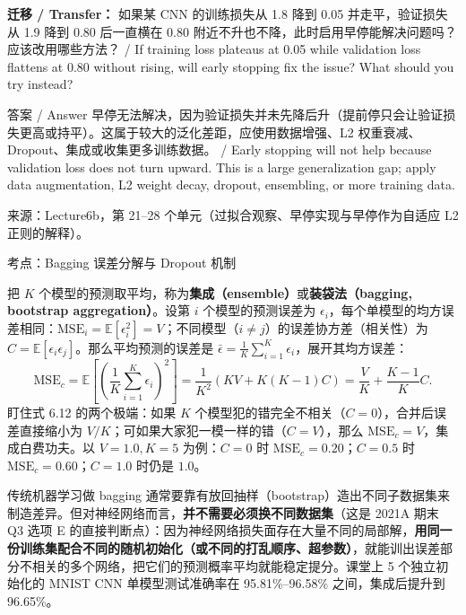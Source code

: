 \textbf{迁移 / Transfer：} 如果某 CNN 的训练损失从 1.8 降到 0.05 并走平，验证损失从 1.9 降到 0.80 后一直横在 0.80 附近不升也不降，此时启用早停能解决问题吗？应该改用哪些方法？ / If training loss plateaus at 0.05 while validation loss flattens at 0.80 without rising, will early stopping fix the issue? What should you try instead?

\begin{StudySolution}{答案 / Answer}
早停无法解决，因为验证损失并未先降后升（提前停只会让验证损失更高或持平）。这属于较大的泛化差距，应使用数据增强、L2 权重衰减、Dropout、集成或收集更多训练数据。 / Early stopping will not help because validation loss does not turn upward. This is a large generalization gap; apply data augmentation, L2 weight decay, dropout, ensembling, or more training data.
\end{StudySolution}

来源：Lecture6b，第 21–28 个单元（过拟合观察、早停实现与早停作为自适应 L2 正则的解释）。



考点：Bagging 误差分解与 Dropout 机制 


把 $K$ 个模型的预测取平均，称为\textbf{集成（ensemble）}或\textbf{装袋法（bagging, bootstrap aggregation）}。设第 $i$ 个模型的预测误差为 $\epsilon_i$，每个单模型的均方误差相同：$\mathrm{MSE}_i = \mathbb{E}[\epsilon_i^2] = V$；不同模型（$i\ne j$）的误差协方差（相关性）为 $C = \mathbb{E}[\epsilon_i\epsilon_j]$。那么平均预测的误差是 $\bar{\epsilon} = \frac{1}{K}\sum_{i=1}^K \epsilon_i$，展开其均方误差：
\[
\mathrm{MSE}_c = \mathbb{E}\!\left[\left(\frac{1}{K}\sum_{i=1}^K \epsilon_i\right)^2\right]
= \frac{1}{K^2}\left(K V + K(K-1)C\right)
= \frac{V}{K} + \frac{K-1}{K}C.
\tag{6.12}
\]
盯住式 6.12 的两个极端：如果 $K$ 个模型犯的错完全不相关（$C=0$），合并后误差直接缩小为 $V/K$；可如果大家犯一模一样的错（$C=V$），那么 $\mathrm{MSE}_c = V$，集成白费功夫。以 $V=1.0, K=5$ 为例：$C=0$ 时 $\mathrm{MSE}_c = 0.20$；$C=0.5$ 时 $\mathrm{MSE}_c = 0.60$；$C=1.0$ 时仍是 $1.0$。

传统机器学习做 bagging 通常要靠有放回抽样（bootstrap）造出不同子数据集来制造差异。但对神经网络而言，\textbf{并不需要必须换不同数据集}（这是 2021A 期末 Q3 选项 E 的直接判断点）：因为神经网络损失面存在大量不同的局部解，\textbf{用同一份训练集配合不同的随机初始化（或不同的打乱顺序、超参数）}，就能训出误差部分不相关的多个网络，把它们的预测概率平均就能稳定提分。课堂上 5 个独立初始化的 MNIST CNN 单模型测试准确率在 95.81\%–96.58\% 之间，集成后提升到 96.65\%。

